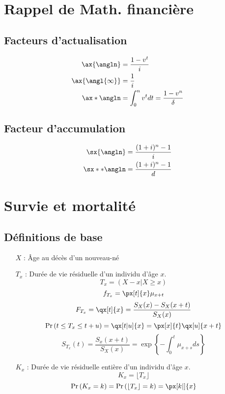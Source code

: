 \documentclass[10pt, french]{article}
\begin{document}
\footnotesize %
\begin{multicols*}{3} %
\section*{Rappel de Math. financière}
\subsection*{Facteurs d'actualisation}
\begin{align*}
	\ax{\angln}&= \frac{1 - v^t}{i} \\
	\ax{\angl{\infty}} &= \frac{1}{i} \\
	\ax*{\angln} &= \int_0^n v^t dt = \frac{1 - v^n}{\delta}
\end{align*}

\subsection*{Facteur d'accumulation}
\begin{align*}
\sx{\angln} &= \frac{(1+i)^{n} - 1}{i} \\
\sx**{\angln} &= \frac{(1+i)^{n} - 1}{d} \\
\end{align*}


\section{Survie et mortalité}
\subsection{Définitions de base}
\begin{itemize}
\item[$X$ : ] Âge au décès d'un nouveau-né
\item[$T_x$ : ] Durée de vie résiduelle d'un individu d'âge $x$.
\[T_x = (X-x | X \geq x) \]
\[ f_{T_x} = \px[t]{x} \mu_{x+t} \]
\[ F_{T_x}   =\qx[t]{x} = \frac{S_X(x) - S_X(x+t)}{S_X(x)}  \]
\[ \prob{t \leq T_x \leq t+u} = \qx[t|u]{x} = \px[x]{t} \qx[u]{x+t} \]
\[S_{T_x}(t) = \frac{S_x(x+t)}{S_X(x)} = \exp \left\{ - \int_{0}^{t} \mu_{x+s} ds \right\}  \]
\item[$K_x$ : ] Durée de vie résiduelle entière d'un individu d'âge $x$.
\[K_x = \lfloor T_x \rfloor \]
\[\prob{K_x = k} = \prob{\lfloor T_x \rfloor = k} = \px[k|]{x} \]


\end{itemize}
\end{multicols*}
\end{document}
